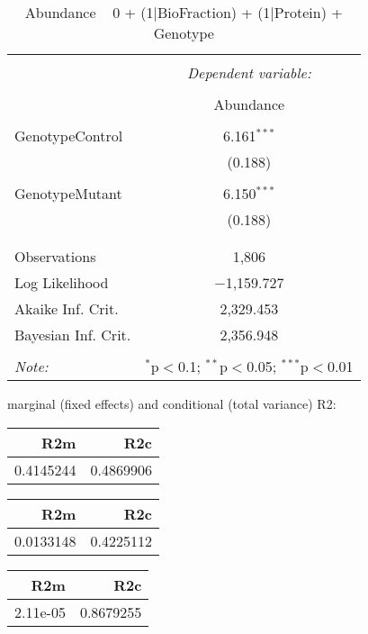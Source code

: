 \documentclass[11pt]{report}
\begin{document}
\begin{table}[!htbp] \centering 
  \caption{Abundance ~ 0 + (1|BioFraction) + (1|Protein) + Genotype} 
  \label{} 
\begin{tabular}{@{\extracolsep{5pt}}lc} 
\\[-1.8ex]\hline 
\hline \\[-1.8ex] 
 & \multicolumn{1}{c}{\textit{Dependent variable:}} \\ 
\cline{2-2} 
\\[-1.8ex] & Abundance \\ 
\hline \\[-1.8ex] 
 GenotypeControl & 6.161$^{***}$ \\ 
  & (0.188) \\ 
  & \\ 
 GenotypeMutant & 6.150$^{***}$ \\ 
  & (0.188) \\ 
  & \\ 
\hline \\[-1.8ex] 
Observations & 1,806 \\ 
Log Likelihood & $-$1,159.727 \\ 
Akaike Inf. Crit. & 2,329.453 \\ 
Bayesian Inf. Crit. & 2,356.948 \\ 
\hline 
\hline \\[-1.8ex] 
\textit{Note:}  & \multicolumn{1}{r}{$^{*}$p$<$0.1; $^{**}$p$<$0.05; $^{***}$p$<$0.01} \\ 
\end{tabular} 
\end{table} 
marginal (fixed effects) and conditional (total variance) R2:

\begin{tabular}{r|r}
\hline
R2m & R2c\\
\hline
0.4145244 & 0.4869906\\
\hline
\end{tabular}

\begin{tabular}{r|r}
\hline
R2m & R2c\\
\hline
0.0133148 & 0.4225112\\
\hline
\end{tabular}

\begin{tabular}{r|r}
\hline
R2m & R2c\\
\hline
2.11e-05 & 0.8679255\\
\hline
\end{tabular}
\end{document}
